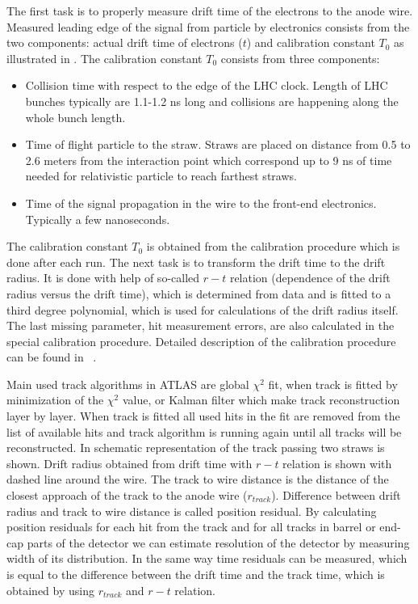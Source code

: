 The first task is to properly measure drift time of the electrons to the anode wire. Measured leading edge of the signal from particle by electronics 
consists from the two components: actual drift time of electrons ($t$) and calibration constant $T_{0}$ as illustrated in .
The calibration constant $T_{0}$ consists from three components:
\begin{itemize}
 \item Collision time with respect to the edge of the LHC clock. Length of LHC bunches typically are 1.1-1.2 ns long and collisions are happening along the whole bunch length.
 \item Time of flight particle to the straw. Straws are placed on distance from 0.5 to 2.6 meters from the interaction point 
 which correspond up to 9 ns of time needed for relativistic particle to reach farthest straws.
 \item Time of the signal propagation in the wire to the front-end electronics. Typically a few nanoseconds.
\end{itemize}
The calibration constant $T_{0}$ is obtained from the calibration procedure which is done after each run.
The next task is to transform the drift time to the drift radius. It is done with help of so-called $r-t$ relation (dependence of the drift radius versus the drift time), 
which is determined from data and is fitted to a third degree polynomial, which is used for calculations of the drift radius itself.
The last missing parameter, hit measurement errors, are also calculated in the special calibration procedure. Detailed description of the calibration procedure
can be found in ~\cite{alonso_thesis}.

Main used track algorithms in ATLAS are global $\chi^2$ fit, when track is fitted by minimization of the $\chi^2$ value, or Kalman filter which make track reconstruction
layer by layer. When track is fitted all used hits in the fit are removed from the list of available hits and track algorithm is running again until all tracks will be reconstructed.
In  schematic representation of the track passing two straws is shown. Drift radius obtained from drift time with $r-t$ relation is
shown with dashed line around the wire. The track to wire distance is the distance of the closest approach of the track to the anode wire ($r_{track}$). Difference
between drift radius and track to wire distance is called position residual. By calculating position residuals for each hit from the track and for all
tracks in barrel or end-cap parts of the detector we can estimate resolution of the detector by measuring width of its distribution.
In the same way time residuals can be measured, which is equal to the difference between the drift time and the track time, which is obtained by using $r_{track}$ and 
$r-t$ relation.


